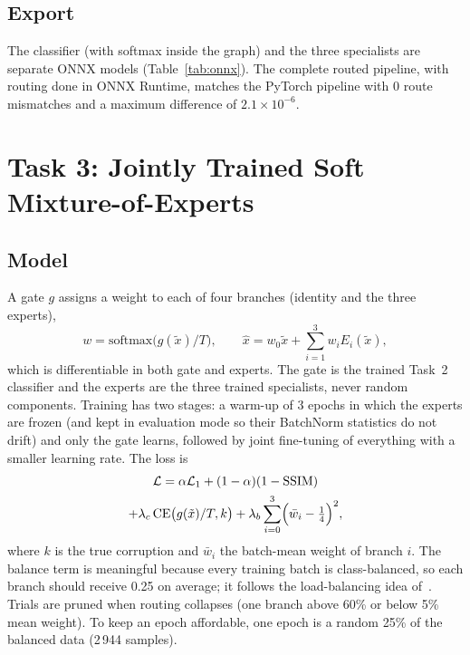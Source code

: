 \documentclass[conference]{IEEEtran}
\begin{document}
\subsection{Export}
The classifier (with softmax inside the graph) and the three specialists are separate ONNX models (Table~\ref{tab:onnx}). The complete routed pipeline, with routing done in ONNX Runtime, matches the PyTorch pipeline with 0 route mismatches and a maximum difference of $2.1\times10^{-6}$.

\section{Task 3: Jointly Trained Soft Mixture-of-Experts}
\subsection{Model}
A gate $g$ assigns a weight to each of four branches (identity and the three experts),
\begin{equation}
w=\mathrm{softmax}\bigl(g(\tilde x)/T\bigr),\qquad \hat x=w_0\tilde x+\sum_{i=1}^{3}w_iE_i(\tilde x),
\end{equation}
which is differentiable in both gate and experts. The gate is the trained Task~2 classifier and the experts are the three trained specialists, never random components. Training has two stages: a warm-up of 3 epochs in which the experts are frozen (and kept in evaluation mode so their BatchNorm statistics do not drift) and only the gate learns, followed by joint fine-tuning of everything with a smaller learning rate. The loss is
\begin{multline}
\mathcal{L}=\alpha\mathcal{L}_1+(1-\alpha)(1-\mathrm{SSIM})\\
+\lambda_c\,\mathrm{CE}\bigl(g(\tilde x)/T,k\bigr)+\lambda_b\sum_{i=0}^{3}\Bigl(\bar w_i-\tfrac14\Bigr)^2,
\end{multline}
where $k$ is the true corruption and $\bar w_i$ the batch-mean weight of branch $i$. The balance term is meaningful because every training batch is class-balanced, so each branch should receive 0.25 on average; it follows the load-balancing idea of~\cite{shazeer2017,fedus2022}. Trials are pruned when routing collapses (one branch above 60\% or below 5\% mean weight). To keep an epoch affordable, one epoch is a random 25\% of the balanced data (2\,944 samples).
\end{document}

